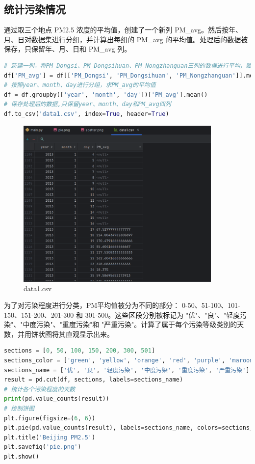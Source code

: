 \documentclass[lang=cn,11pt,a4paper]{elegantpaper}
\begin{document}
\subsection{统计污染情况}
通过取三个地点 PM2.5 浓度的平均值，创建了一个新列 PM\_avg。然后按年、月、日对数据集进行分组，并计算出每组的 PM\_avg 的平均值。处理后的数据被保存，只保留年、月、日和 PM\_avg 列。
\begin{lstlisting}[language=python]
# 新建一列，将PM_Dongsi、PM_Dongsihuan、PM_Nongzhanguan三列的数据进行平均，赋值给新建的列PM_avg
df['PM_avg'] = df[['PM_Dongsi', 'PM_Dongsihuan', 'PM_Nongzhanguan']].mean(axis=1)
# 按照year、month、day进行分组，求PM_avg的平均值
df = df.groupby(['year', 'month', 'day'])['PM_avg'].mean()
# 保存处理后的数据,只保留year、month、day和PM_avg四列
df.to_csv('data1.csv', index=True, header=True)
\end{lstlisting}

\begin{figure}[H]
    \centering
    \includegraphics[width=0.9\textwidth]{image/data1.png}
    \caption{data1.csv}
\end{figure}

为了对污染程度进行分类，PM平均值被分为不同的部分： 0-50、51-100、101-150、151-200、201-300 和 301-500。这些区段分别被标记为 "优"、"良"、"轻度污染"、"中度污染"、"重度污染"和 "严重污染"。计算了属于每个污染等级类别的天数，并用饼状图将其直观显示出来。

\begin{lstlisting}[language=python]
sections = [0, 50, 100, 150, 200, 300, 501]
sections_color = ['green', 'yellow', 'orange', 'red', 'purple', 'maroon']
sections_name = ['优', '良', '轻度污染', '中度污染', '重度污染', '严重污染']
result = pd.cut(df, sections, labels=sections_name)
# 统计各个污染程度的天数
print(pd.value_counts(result))
# 绘制饼图
plt.figure(figsize=(6, 6))
plt.pie(pd.value_counts(result), labels=sections_name, colors=sections_color, autopct='%1.1f%%')
plt.title('Beijing PM2.5')
plt.savefig('pie.png')
plt.show()
\end{lstlisting}
\end{document}
